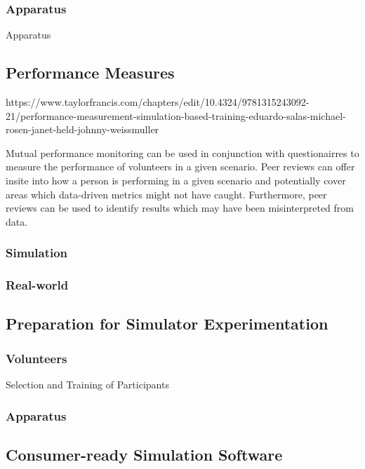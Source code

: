 \documentclass[12pt]{article}
\begin{document}
\subsubsection{Apparatus}

Apparatus

\subsection{Performance Measures} \label{performanceMeasures}

https://www.taylorfrancis.com/chapters/edit/10.4324/9781315243092-21/performance-measurement-simulation-based-training-eduardo-salas-michael-rosen-janet-held-johnny-weissmuller

Mutual performance monitoring can be used in conjunction with questionairres to measure the performance of volunteers in a given scenario. \cite{salas2017performance} Peer reviews can offer insite into how a person is performing in a given scenario and potentially cover areas which data-driven metrics might not have caught. Furthermore, peer reviews can be used to identify results which may have been misinterpreted from data. 

\subsubsection{Simulation}

\subsubsection{Real-world}

\subsection{Preparation for Simulator Experimentation}

\subsubsection{Volunteers}

Selection and Training of Participants

\subsubsection{Apparatus}

\subsection{Consumer-ready Simulation Software}
\end{document}
